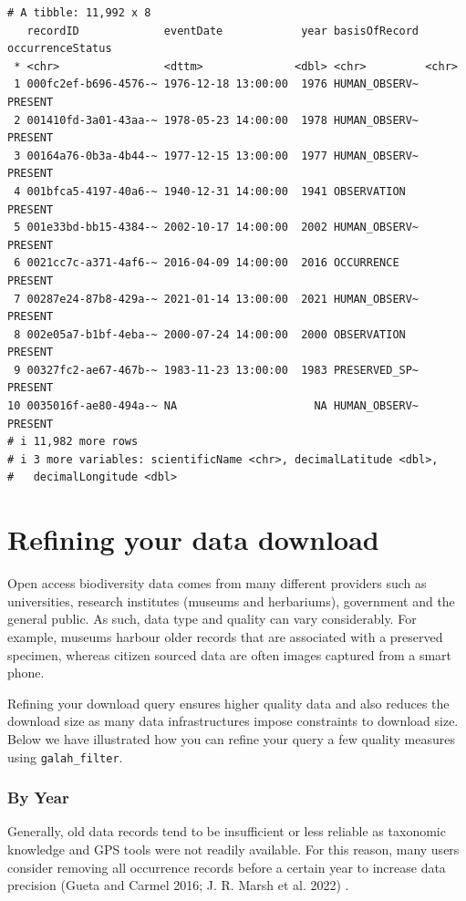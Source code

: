 \documentclass[
  letterpaper,
  DIV=11,
  numbers=noendperiod,
  oneside]{scrreprt}
\begin{document}
\begin{verbatim}
# A tibble: 11,992 x 8
   recordID             eventDate            year basisOfRecord occurrenceStatus
 * <chr>                <dttm>              <dbl> <chr>         <chr>           
 1 000fc2ef-b696-4576-~ 1976-12-18 13:00:00  1976 HUMAN_OBSERV~ PRESENT         
 2 001410fd-3a01-43aa-~ 1978-05-23 14:00:00  1978 HUMAN_OBSERV~ PRESENT         
 3 00164a76-0b3a-4b44-~ 1977-12-15 13:00:00  1977 HUMAN_OBSERV~ PRESENT         
 4 001bfca5-4197-40a6-~ 1940-12-31 14:00:00  1941 OBSERVATION   PRESENT         
 5 001e33bd-bb15-4384-~ 2002-10-17 14:00:00  2002 HUMAN_OBSERV~ PRESENT         
 6 0021cc7c-a371-4af6-~ 2016-04-09 14:00:00  2016 OCCURRENCE    PRESENT         
 7 00287e24-87b8-429a-~ 2021-01-14 13:00:00  2021 HUMAN_OBSERV~ PRESENT         
 8 002e05a7-b1bf-4eba-~ 2000-07-24 14:00:00  2000 OBSERVATION   PRESENT         
 9 00327fc2-ae67-467b-~ 1983-11-23 13:00:00  1983 PRESERVED_SP~ PRESENT         
10 0035016f-ae80-494a-~ NA                     NA HUMAN_OBSERV~ PRESENT         
# i 11,982 more rows
# i 3 more variables: scientificName <chr>, decimalLatitude <dbl>,
#   decimalLongitude <dbl>
\end{verbatim}

\hypertarget{refining-your-data-download}{%
\section{Refining your data
download}\label{refining-your-data-download}}

Open access biodiversity data comes from many different providers such
as universities, research institutes (museums and herbariums),
government and the general public. As such, data type and quality can
vary considerably. For example, museums harbour older records that are
associated with a preserved specimen, whereas citizen sourced data are
often images captured from a smart phone.

Refining your download query ensures higher quality data and also
reduces the download size as many data infrastructures impose
constraints to download size. Below we have illustrated how you can
refine your query a few quality measures using \texttt{galah\_filter}.

\hypertarget{by-year}{%
\subsubsection{By Year}\label{by-year}}

Generally, old data records tend to be insufficient or less reliable as
taxonomic knowledge and GPS tools were not readily available. For this
reason, many users consider removing all occurrence records before a
certain year to increase data precision (Gueta and Carmel 2016; J. R.
Marsh et al. 2022) .
\end{document}
